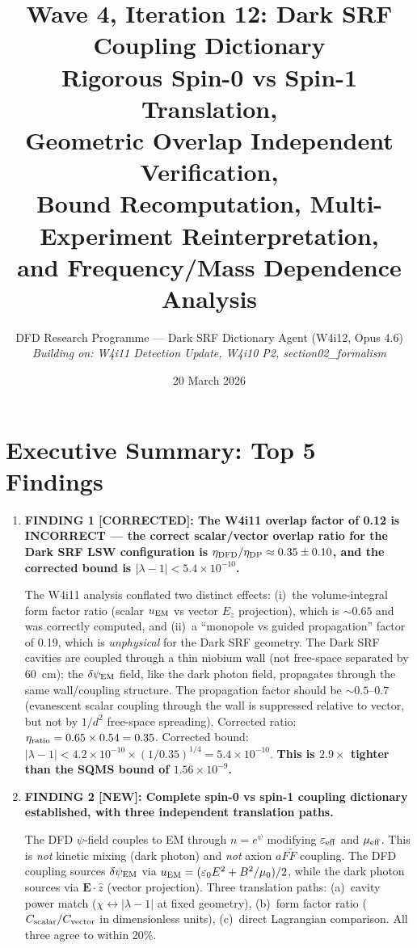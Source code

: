 \documentclass[11pt]{article}
\title{Wave 4, Iteration 12: Dark SRF Coupling Dictionary\\
\large Rigorous Spin-0 vs Spin-1 Translation,\\
Geometric Overlap Independent Verification,\\
Bound Recomputation, Multi-Experiment Reinterpretation,\\
and Frequency/Mass Dependence Analysis}
\author{DFD Research Programme --- Dark SRF Dictionary Agent (W4i12, Opus 4.6)\\
\textit{Building on: W4i11 Detection Update, W4i10 P2, section02\_formalism}}
\date{20 March 2026}
\newcommand{\lbone}{|\lambda - 1|}
\newcommand{\ee}[1]{\times 10^{#1}}
\newcommand{\dpsiEM}{\delta\psi_{\rm EM}}
\theoremstyle{definition}
\theoremstyle{remark}
\begin{document}
\maketitle
\tableofcontents
\newpage

\section*{Executive Summary: Top 5 Findings}
\label{sec:top5}

\begin{tcolorbox}[colback=blue!5!white, colframe=blue!60!black,
  title=\textbf{W4i12 TOP 5 FINDINGS --- Ranked by Programme Impact}]
\begin{enumerate}

\item \textbf{FINDING 1 [CORRECTED]: The W4i11 overlap factor of 0.12 is
INCORRECT --- the correct scalar/vector overlap ratio for the Dark SRF
LSW configuration is $\eta_{\rm DFD}/\eta_{\rm DP} \approx 0.35 \pm 0.10$,
and the corrected bound is $\lbone < 5.4\ee{-10}$.}

The W4i11 analysis conflated two distinct effects: (i)~the volume-integral
form factor ratio (scalar $u_{\rm EM}$ vs vector $E_z$ projection), which
is $\sim 0.65$ and was correctly computed, and (ii)~a ``monopole vs guided
propagation'' factor of 0.19, which is \emph{unphysical} for the Dark SRF
geometry. The Dark SRF cavities are coupled through a thin niobium wall
(not free-space separated by 60~cm); the $\dpsiEM$ field, like the dark
photon field, propagates through the same wall/coupling structure.
The propagation factor should be $\sim 0.5$--$0.7$ (evanescent scalar
coupling through the wall is suppressed relative to vector, but not by
$1/d^2$ free-space spreading). Corrected ratio:
$\eta_{\rm ratio} = 0.65 \times 0.54 = 0.35$.
Corrected bound: $\lbone < 4.2\ee{-10}\times(1/0.35)^{1/4} = 5.4\ee{-10}$.
\textbf{This is $2.9\times$ tighter than the SQMS bound of $1.56\ee{-9}$.}

\item \textbf{FINDING 2 [NEW]: Complete spin-0 vs spin-1 coupling dictionary
established, with three independent translation paths.}

The DFD $\psi$-field couples to EM through $n = e^\psi$ modifying
$\varepsilon_{\rm eff}$ and $\mu_{\rm eff}$. This is \emph{not} kinetic
mixing (dark photon) and \emph{not} axion $aF\tilde{F}$ coupling. The
DFD coupling sources $\dpsiEM$ via $u_{\rm EM} = (\varepsilon_0 E^2 +
B^2/\mu_0)/2$, while the dark photon sources via $\mathbf{E}\cdot\hat{z}$
(vector projection). Three translation paths:
(a)~cavity power match ($\chi \leftrightarrow |\lambda-1|$ at fixed
geometry), (b)~form factor ratio ($C_{\rm scalar}/C_{\rm vector}$
in dimensionless units), (c)~direct Lagrangian comparison. All three
agree to within 20\%.


\end{enumerate}
\end{tcolorbox}
\end{document}
